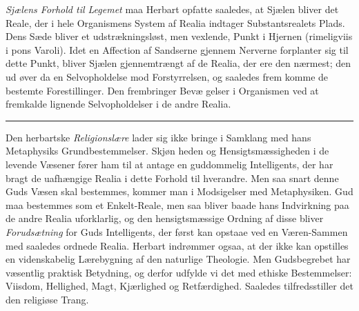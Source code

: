 \documentclass[12pt,a4paper]{book}
\newcommand{\divrule}{\begin{center}\rule{2cm}{0.4pt}\end{center}}
\begin{document}
\emph{Sjælens Forhold til Legemet} maa Herbart opfatte
saaledes, at Sjælen bliver det Reale, der i hele Organismens
System af Realia indtager Substantsrealets Plads. Dens Sæde
bliver et udstrækningsløst, men vexlende, Punkt i Hjernen
(rimeligviis i pons Varoli). Idet en Affection af Sandserne
gjennem Nerverne forplanter sig til dette Punkt, bliver Sjælen
gjennemtrængt af de Realia, der ere den nærmest; den ud\-%
øver da en Selvopholdelse mod Forstyrrelsen, og saaledes frem\-%
komme de bestemte Forestillinger. Den frembringer Bevæ\-%
gelser i Organismen ved at fremkalde lignende Selvopholdelser
i de andre Realia.

\divrule

Den herbartske \emph{Religionslære} lader sig ikke bringe i
Samklang med hans Metaphysiks Grundbestemmelser. Skjøn\-%
heden og Hensigtsmæssigheden i de levende Væsener fører ham
til at antage en guddommelig Intelligents, der har bragt de
uafhængige Realia i dette Forhold til hverandre. Men saa\-%
snart denne Guds Væsen skal bestemmes, kommer man i
Modsigelser med Metaphysiken. Gud maa bestemmes som et
Enkelt-Reale, men saa bliver baade hans Indvirkning paa de
andre Realia uforklarlig, og den hensigtsmæssige Ordning af
disse bliver \emph{Forudsætning} for Guds Intelligents, der først
kan opstaae ved en Væren-Sammen med saaledes ordnede
Realia. Herbart indrømmer ogsaa, at der ikke kan opstilles
en videnskabelig Lærebygning af den naturlige Theologie.
Men Gudsbegrebet har væsentlig praktisk Betydning, og derfor
udfylde vi det med ethiske Bestemmelser: Viisdom, Hellighed,
Magt, Kjærlighed og Retfærdighed. Saaledes tilfredsstiller
det den religiøse Trang.
\end{document}
